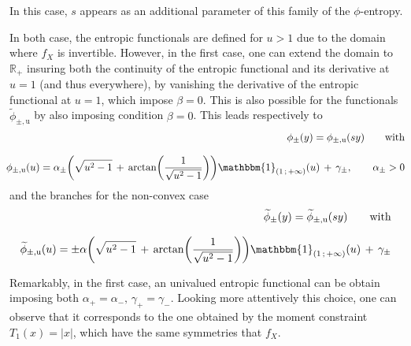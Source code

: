 \documentclass[entropy,article,submit,moreauthors,pdftex]{Definitions/mdpi}
\def\Rset{\mathbb{R}}%
\def\un{\mathbbm{1}}%
\def\u{\mathrm{u}}
\begin{document}
{In  this case,  $s$ appears  as an  additional parameter  of this  family of  the
$\phi$-entropy.

In both case, the entropic functionals are defined for $u > 1$ due to the domain
where $f_X$ is invertible. However, in the first case, one can extend the domain
to $\Rset_+$  insuring both the  continuity of  the entropic functional  and its
derivative at $u = 1$ (and thus  everywhere), by vanishing the derivative of the
entropic functional at $u = 1$, which impose $\beta = 0$.
This is  also possible  for the
functionals $\widetilde{\phi}_{\pm,\u}$  by also imposing  condition $\beta =  0$.
This leads respectively to
%
\begin{eqnarray*}
  &&\hspace{-5mm}\phi_\pm(y) =  \phi_{\pm,\u}(s y) \qquad  \mbox{with} \\[2.5mm]
  &&\hspace{-5mm}\phi_{\pm,\u}(u) =  \alpha_\pm \left(  \sqrt{u^2 -  1} \,  + \,
  \arctan\left(  \frac{1}{\sqrt{u^2  -  1}}   \right)  \right)
  \un_{\left( 1 \, ; \, +\infty \right)}(u) \, + \, \gamma_\pm, \qquad \alpha_\pm > 0
\end{eqnarray*}
%
and the branches for the non-convex case
%
\begin{eqnarray*}
  &&\hspace{-5mm}\widetilde{\phi}_\pm(y) = \widetilde{\phi}_{\pm,\u}(s y) \qquad \mbox{with}
  \\[2.5mm]
  &&\hspace{-5mm}
  \widetilde{\phi}_{\pm,\u}(u) = \pm \alpha \left(  \sqrt{u^2 - 1} \, +
\, \arctan\left( \frac{1}{\sqrt{u^2 - 1}} \right)  \right) \un_{\left( 1 \, ;
  \, +\infty \right)}(u) \, + \, \gamma_\pm
\end{eqnarray*}
%

Remarkably, in  the first case, an  univalued entropic functional can  be obtain
imposing both $\alpha_+  = \alpha_-, \, \gamma_+ = \gamma_-$.
%
%
Looking more attentively this choice, one can observe that it corresponds to the
one  obtained by  the moment  constraint  $T_1(x) =  |x|$, which  have the  same
symmetries that $f_X$.}
\end{document}
